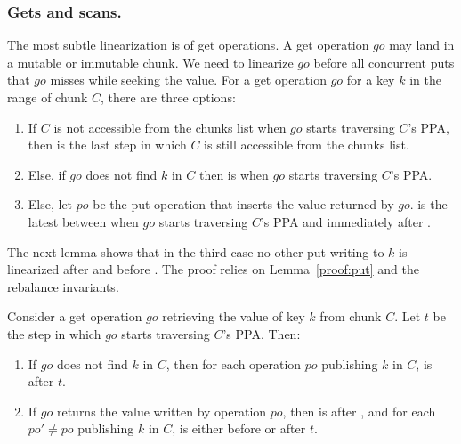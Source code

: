 

\subsubsection{Gets and scans.}
\label{ssec:get-proof}

The most subtle linearization is of get operations.
A get operation $go$ may land in a mutable or immutable chunk. 
We need to linearize $go$ before all concurrent puts that $go$ misses while seeking the value.
For a get operation $go$ for a key $k$ in the range of chunk $C$, there are three options:
\begin{enumerate}
\setlength{\itemsep}{0pt}
\setlength{\parskip}{0pt}
\item If $C$ is not accessible from the chunks list when $go$ starts traversing $C$'s PPA, then  is the last step in which $C$ is still accessible from the chunks list.
\item Else, if $go$ does not find $k$ in $C$ then  is when $go$ starts traversing $C$'s PPA.
\item Else, let $po$ be the put operation that inserts the value returned by $go$.  is the latest between when $go$ starts traversing $C$'s {PPA} and immediately after .
\end{enumerate}

The next lemma shows that in the third case no other put writing to $k$ is linearized after  and before .
The proof relies on %
Lemma~\ref{proof:put} and the rebalance invariants.%

\begin{lemma}
\label{proof:get}
Consider a get operation $go$ retrieving the value of key $k$ from chunk $C$. Let $t$ be the step in which $go$ starts traversing $C$'s {PPA}. Then:
\begin{enumerate}
\setlength{\itemsep}{0pt}
\setlength{\parskip}{0pt}
\item \label{proof:get:lp1} If $go$ does not find $k$ in $C$, then for each operation $po$ publishing $k$ in $C$,  is after $t$.
\item \label{proof:get:lp2} If $go$ returns the value written by operation $po$, then  is after , and for each  $po' \neq po$ publishing $k$ in $C$,  is either before  or after $t$.
\end{enumerate}
\end{lemma}

